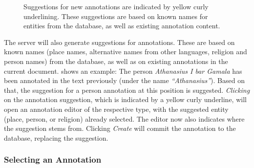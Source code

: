 \begin{figure}[htb]
  \centering
  \caption{
    Suggestions for new annotations are indicated by yellow curly underlining.
    These suggestions are based on known names for entities from the database, as well as existing annotation content.
  }
  \label{fig:annotation-suggestion}
\end{figure}

The server will also generate suggestions for annotations.
These are based on known names (place names, alternative names from other languages, religion and person names) from the database, as well as on existing annotations in the current document.
 shows an example:
The person \emph{Athanasius I bar Gamala} has been annotated in the text previously (under the name \emph{\enquote{Athanasius}}).
Based on that, the suggestion for a person annotation at this position is suggested.
\emph{Clicking} on the annotation suggestion, which is indicated by a yellow curly underline, will open an annotation editor of the respective type, with the suggested entity (place, person, or religion) already selected.
The editor now also indicates where the suggestion stems from.
Clicking \emph{Create} will commit the annotation to the database, replacing the suggestion.


\subsubsection{Selecting an Annotation}
\label{sec:annotation-selection}

